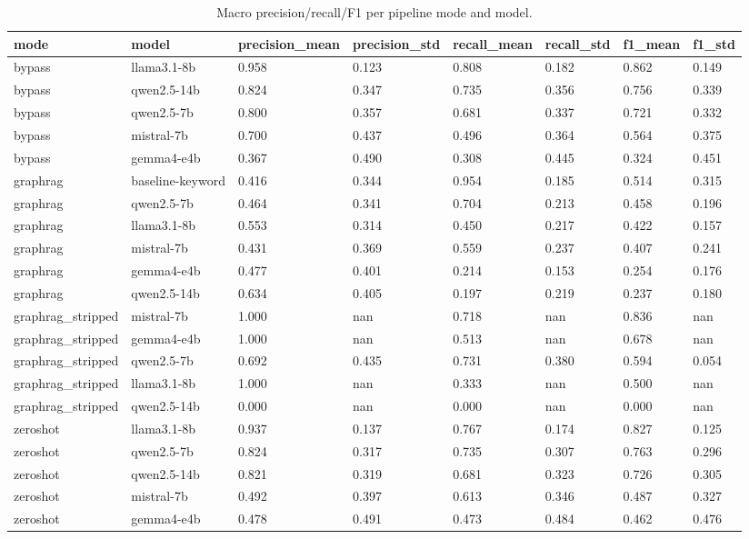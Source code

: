 \begin{table}[ht]
\centering
\caption{Macro precision/recall/F1 per pipeline mode and model.}
\label{tab:headline}
\begin{tabular}{llllllll}
\toprule
mode & model & precision\_mean & precision\_std & recall\_mean & recall\_std & f1\_mean & f1\_std \\
\midrule
bypass & llama3.1-8b & 0.958 & 0.123 & 0.808 & 0.182 & 0.862 & 0.149 \\
bypass & qwen2.5-14b & 0.824 & 0.347 & 0.735 & 0.356 & 0.756 & 0.339 \\
bypass & qwen2.5-7b & 0.800 & 0.357 & 0.681 & 0.337 & 0.721 & 0.332 \\
bypass & mistral-7b & 0.700 & 0.437 & 0.496 & 0.364 & 0.564 & 0.375 \\
bypass & gemma4-e4b & 0.367 & 0.490 & 0.308 & 0.445 & 0.324 & 0.451 \\
graphrag & baseline-keyword & 0.416 & 0.344 & 0.954 & 0.185 & 0.514 & 0.315 \\
graphrag & qwen2.5-7b & 0.464 & 0.341 & 0.704 & 0.213 & 0.458 & 0.196 \\
graphrag & llama3.1-8b & 0.553 & 0.314 & 0.450 & 0.217 & 0.422 & 0.157 \\
graphrag & mistral-7b & 0.431 & 0.369 & 0.559 & 0.237 & 0.407 & 0.241 \\
graphrag & gemma4-e4b & 0.477 & 0.401 & 0.214 & 0.153 & 0.254 & 0.176 \\
graphrag & qwen2.5-14b & 0.634 & 0.405 & 0.197 & 0.219 & 0.237 & 0.180 \\
graphrag\_stripped & mistral-7b & 1.000 & nan & 0.718 & nan & 0.836 & nan \\
graphrag\_stripped & gemma4-e4b & 1.000 & nan & 0.513 & nan & 0.678 & nan \\
graphrag\_stripped & qwen2.5-7b & 0.692 & 0.435 & 0.731 & 0.380 & 0.594 & 0.054 \\
graphrag\_stripped & llama3.1-8b & 1.000 & nan & 0.333 & nan & 0.500 & nan \\
graphrag\_stripped & qwen2.5-14b & 0.000 & nan & 0.000 & nan & 0.000 & nan \\
zeroshot & llama3.1-8b & 0.937 & 0.137 & 0.767 & 0.174 & 0.827 & 0.125 \\
zeroshot & qwen2.5-7b & 0.824 & 0.317 & 0.735 & 0.307 & 0.763 & 0.296 \\
zeroshot & qwen2.5-14b & 0.821 & 0.319 & 0.681 & 0.323 & 0.726 & 0.305 \\
zeroshot & mistral-7b & 0.492 & 0.397 & 0.613 & 0.346 & 0.487 & 0.327 \\
zeroshot & gemma4-e4b & 0.478 & 0.491 & 0.473 & 0.484 & 0.462 & 0.476 \\
\bottomrule
\end{tabular}
\end{table}
